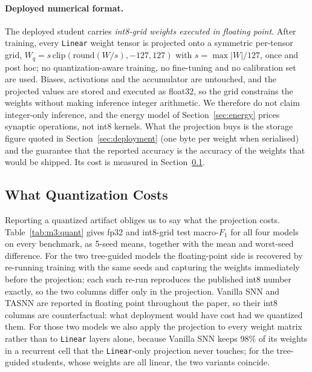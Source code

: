 
\paragraph{Deployed numerical format.}
The deployed student carries \emph{int8-grid weights executed in floating point}.
After training, every \texttt{Linear} weight tensor is projected onto a symmetric
per-tensor grid, $W_q = s\,\mathrm{clip}(\mathrm{round}(W/s), -127, 127)$ with
$s = \max|W|/127$, once and post hoc; no quantization-aware training, no
fine-tuning and no calibration set are used. Biases, activations and the
accumulator are untouched, and the projected values are stored and executed as
float32, so the grid constrains the weights without making inference integer
arithmetic. We therefore do not claim integer-only inference, and the energy
model of Section~\ref{sec:energy} prices synaptic operations, not int8 kernels.
What the projection buys is the storage figure quoted in
Section~\ref{sec:deployment} (one byte per weight when serialised) and the
guarantee that the reported accuracy is the accuracy of the weights that would be
shipped. Its cost is measured in Section~\ref{subsec:quantcost}.

\subsection{What Quantization Costs}
\label{subsec:quantcost}

Reporting a quantized artifact obliges us to say what the projection costs.
Table~\ref{tab:m3:quant} gives fp32 and int8-grid test macro-$F_1$ for all four
models on every benchmark, as 5-seed means, together with the mean and
worst-seed difference. For the two tree-guided models the floating-point side is
recovered by re-running training with the same seeds and capturing the weights
immediately before the projection; each such re-run reproduces the published
int8 number exactly, so the two columns differ only in the projection. Vanilla
SNN and TASNN are reported in floating point throughout the paper, so their int8
columns are counterfactual: what deployment would have cost had we quantized
them. For those two models we also apply the projection to every weight matrix
rather than to \texttt{Linear} layers alone, because Vanilla SNN keeps 98\% of
its weights in a recurrent cell that the \texttt{Linear}-only projection never
touches; for the tree-guided students, whose weights are all linear, the two
variants coincide.

